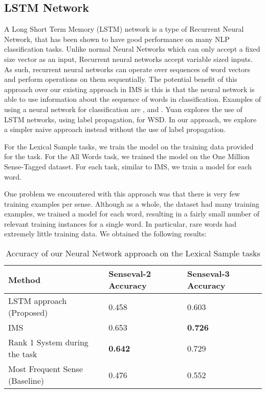 \subsection{LSTM Network}

A Long Short Term Memory (LSTM) network is a type of Recurrent Neural Network, that has been shown to have good performance on many NLP classification tasks. Unlike normal Neural Networks which can only accept a fixed size vector as an input, Recurrent neural networks accept variable sized inputs. As such, recurrent neural networks can operate over sequences of word vectors and perform operations on them sequentially. The potential benefit of this approach over our existing approach in IMS is this is that the neural network is able to use information about the sequence of words in classification. Examples of using a neural network for classification are \cite{socher2011parsing}, and \cite{socher2013recursive}. Yuan  explores the use of LSTM networks, using label propagation, for WSD. In our approach, we explore a simpler naive approach instead without the use of label propagation.


For the Lexical Sample tasks, we train the model on the training data provided for the task. For the All Words task, we trained the model on the One Million Sense-Tagged dataset. For each task, similar to IMS, we train a model for each word. 

One problem we encountered with this approach was that there is very few training examples per sense. Although as a whole, the dataset had many training examples, we trained a model for each word, resulting in a fairly small number of relevant training instances for a single word. In particular, rare words had extremely little training data. We obtained the following results:






\begin{table}
	\caption{Accuracy of our Neural Network approach on the Lexical Sample tasks}
	\label{table:NN-LS}
	\begin{center}
		\begin{tabular}{| p{6cm} | p{4cm} | p{4cm} |}
			\hline
			Method & Senseval-2 Accuracy & Senseval-3 Accuracy \\
			\hline
			LSTM approach (Proposed) & 0.458  & 0.603 \\
			
			\hline
			IMS & 0.653 & {\bf0.726}\\
			\hline
			Rank 1 System during the task & {\bf0.642} & 0.729 \\
			\hline
			Most Frequent Sense (Baseline) & 0.476 & 0.552 \\
			\hline
		\end{tabular}
	\end{center}
\end{table}

